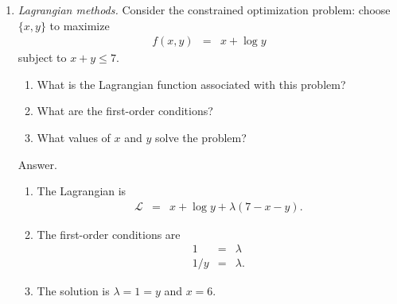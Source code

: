 \documentclass[11pt]{article}
\begin{document}
\begin{enumerate}
\item {\it Lagrangian methods.\/}
Consider the constrained optimization problem:  choose $\{x,y\}$
to maximize
\begin{eqnarray*}
    f(x,y) &=& x + \log y
\end{eqnarray*}
subject to $ x + y \leq 7$.
%
\begin{enumerate}
\item What is the Lagrangian function associated with this problem?
\item What are the first-order conditions?
\item What values of $x$ and $y$ solve the problem?
\end{enumerate}
%
Answer.
\begin{enumerate}
\item The Lagrangian is
\begin{eqnarray*}
    \mathcal{L} &=& x + \log y  + \lambda (7 - x - y ).
\end{eqnarray*}
\item The first-order conditions are
\begin{eqnarray*}
    1 &=& \lambda \\
    1/y &=& \lambda .
\end{eqnarray*}
\item The solution is $\lambda = 1 = y$ and $x = 6$.
\end{enumerate}


\end{enumerate}
\end{document}
